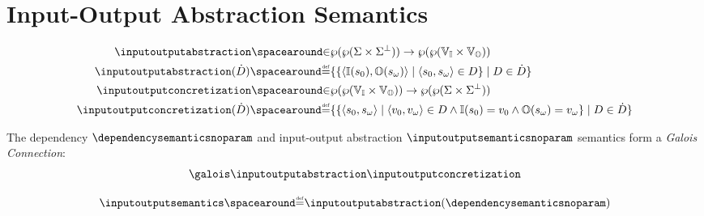 \section{Input-Output Abstraction Semantics}


\begin{definition}
  \begin{align*}
    \inputoutputabstraction \IN& \dependencytype \to \inputoutputtype \\
    \inputoutputabstraction(\defsetofsetofdependencies) \DefeQ& \setdef{
      \setdef{
        \tuple{\inputobs(\retrieveinput{\defstate})}{\outputobs(\retrieveoutput{\defstate})}
      }{
        \inputoutputtuple{\defstate}\in\defsetofdependencies
      }
    }{
      \defsetofdependencies \in \defsetofsetofdependencies
    }\\
    \inputoutputconcretization \IN& \inputoutputtype \to \dependencytype \\
    \inputoutputconcretization(\defsetofsetofdependencies) \DefeQ& \setdef{
      \setdef{
        \inputoutputtuple{\defstate}
      }{
        \inputoutputtuple{\defvalue}\in\defsetofdependencies
        \land
        \inputobs(\retrieveinput{\defstate}) = \retrieveinput\defvalue
        \land
        \outputobs(\retrieveoutput{\defstate}) = \retrieveoutput\defvalue
      }
    }{
      \defsetofdependencies\in\defsetofsetofdependencies
    }
  \end{align*}
\end{definition}

\begin{theorem}
  The dependency $\dependencysemanticsnoparam$ and input-output abstraction $\inputoutputsemanticsnoparam$ semantics form a \emph{Galois Connection}:
\begin{align*}
  \galoisbetweensemantics{dependency}{inputoutput}
\end{align*}
\end{theorem}

\begin{definition}
  \begin{align*}
    \inputoutputsemantics\DefeQ\inputoutputabstraction(\dependencysemanticsnoparam)
  \end{align*}
\end{definition}


